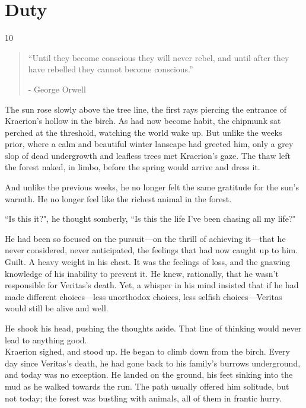 \chapter{Duty}

\vspace{-1.3cm}
\begin{localsize}{10}
    \begin{quote}
        “Until they become conscious they will never rebel, and until after they have rebelled they cannot become conscious.”
        \begin{flushright}- George Orwell \end{flushright}
    \end{quote}
\end{localsize}
\vspace{1cm}


The sun rose slowly above the tree line, the first rays piercing the entrance of Kraerion's hollow in the birch. As had now become habit, the chipmunk sat perched at the threshold, watching the world wake up.
But unlike the weeks prior, where a calm and beautiful winter lanscape had greeted him, only a grey slop of dead undergrowth and leafless trees met Kraerion's gaze. The thaw left the forest naked, in limbo, before the spring would arrive and dress it.

And unlike the previous weeks, he no longer felt the same gratitude for the sun's warmth. He no longer feel like the richest animal in the forest.

``Is this it?", he thought somberly, ``Is this the life I've been chasing all my life?"

He had been so focused on the pursuit---on the thrill of achieving it---that he never considered, never anticipated, the feelings that had now caught up to him. Guilt. A heavy weight in his chest. It was the feelings of loss, and the gnawing knowledge of his inability to prevent it. He knew, rationally, that he wasn't responsible for Veritas's death. Yet, a whisper in his mind insisted that if he had made different choices---less unorthodox choices, less selfish choices---Veritas would still be alive and well.

He shook his head, pushing the thoughts aside. That line of thinking would never lead to anything good.\\

Kraerion sighed, and stood up. He began to climb down from the birch. Every day since Veritas's death, he had gone back to his family's burrows underground, and today was no exception.
He landed on the ground, his feet sinking into the mud as he walked towards the run. The path usually offered him solitude, but not today; the forest was bustling with animals, all of them in frantic hurry.

